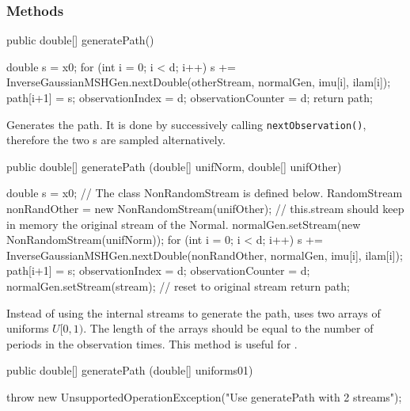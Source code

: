 \subsubsection* {Methods}
\begin{code}

   public double[] generatePath() \begin{hide} {
        double s = x0;
        for (int i = 0; i < d; i++) 
        {
            s += InverseGaussianMSHGen.nextDouble(otherStream,
                                                normalGen, imu[i], ilam[i]);
            path[i+1] = s;
        }
        observationIndex   = d;
        observationCounter = d;
        return path;
    }\end{hide}
\end{code}
\begin{tabb} Generates the path.  It is done by successively calling
\texttt{nextObservation()}, therefore the two
s are
sampled alternatively.
\end{tabb}
\begin{code}

   public double[] generatePath (double[] unifNorm, double[] unifOther) \begin{hide} {
        double s = x0;
        // The class NonRandomStream is defined below.
        RandomStream nonRandOther = new NonRandomStream(unifOther);
        // this.stream should keep in memory the original stream of the Normal.
        normalGen.setStream(new NonRandomStream(unifNorm));
        for (int i = 0; i < d; i++) {
            s += InverseGaussianMSHGen.nextDouble(nonRandOther,
                                                normalGen, imu[i], ilam[i]);
            path[i+1] = s;
        }
        observationIndex   = d;
        observationCounter = d;
        normalGen.setStream(stream);  // reset to original stream
        return path;
    }\end{hide}
\end{code}
\begin{tabb}
Instead of using the internal streams to generate the path,
uses two arrays of uniforms $U[0,1)$.  The length of the arrays should be
equal to the number of periods in the observation
times. This method is useful for .
\end{tabb}
\begin{code}

   public double[] generatePath (double[] uniforms01) \begin{hide} {
       throw new UnsupportedOperationException("Use generatePath with 2 streams");
    }\end{hide}
\end{code}
